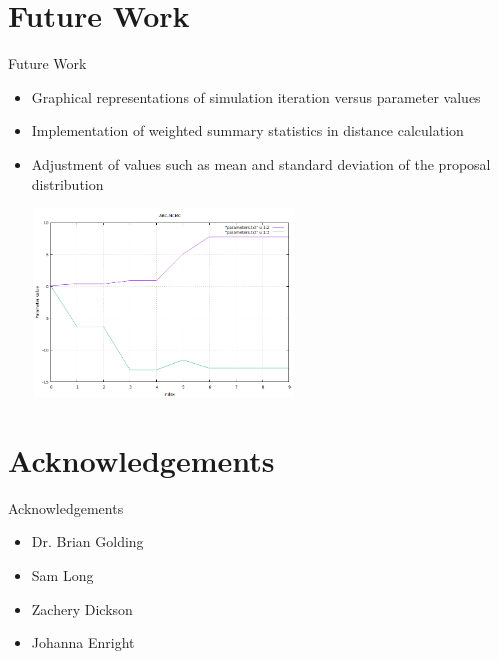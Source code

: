 \documentclass{beamer}
\begin{document}
	\section{Future Work}
	\begin{frame}{Future Work}
		
		\begin{itemize}
			\item Graphical representations of simulation iteration versus parameter values 
			\item Implementation of weighted summary statistics in distance calculation
			\item Adjustment of values such as mean and standard deviation of the proposal distribution
			
			\centering\includegraphics[width=7cm, height=5cm]{graph.png}
			
		\end{itemize}
		
	\end{frame}

	\section{Acknowledgements}
	\begin{frame}{Acknowledgements}
		\begin{itemize}
			\item Dr. Brian Golding \newline
			\item Sam Long \newline
			\item Zachery Dickson \newline
			\item Johanna Enright
		\end{itemize}
	\end{frame}
		
\end{document}
